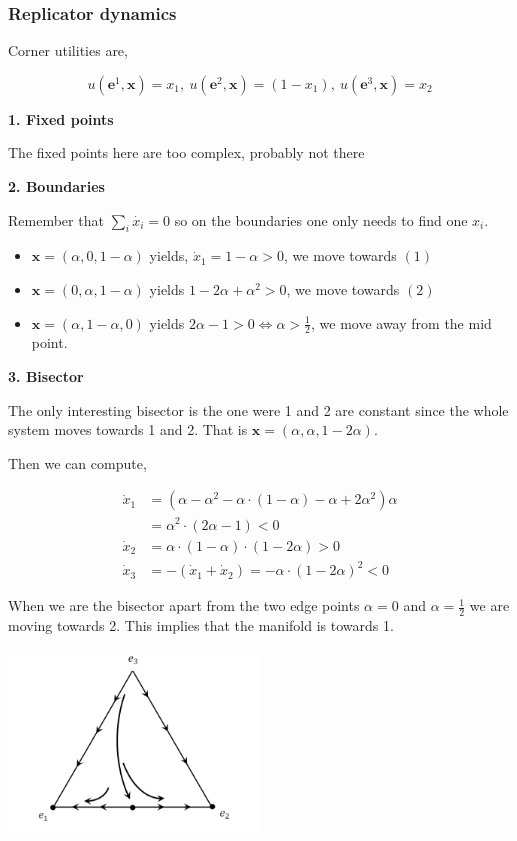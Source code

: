 \documentclass[american]{scrartcl}
\begin{document}
\subsubsection{Replicator dynamics}

Corner utilities are,

\begin{equation}
    u(\bm{e}^1, \bm{x}) = x_1, \ u(\bm{e}^2, \bm{x}) = (1 - x_1),\ u(\bm{e}^3, \bm{x}) = x_2
\end{equation}

\textbf{1. Fixed points}

The fixed points here are too complex, probably not there

\textbf{2. Boundaries}

Remember that $\sum_i \dot{x_i} = 0$ so on the boundaries one only needs to find one $x_i$.

\begin{itemize}
    \item $\bm{x} = \left( \alpha, 0, 1-\alpha \right)$ yields, $\dot{x}_1 = 1 - \alpha > 0$, we move towards $(1)$
    \item $\bm{x} = \left( 0, \alpha, 1-\alpha \right)$ yields $1 - 2\alpha + \alpha^2 > 0$, we move towards $(2)$
    \item $\bm{x} = \left( \alpha, 1-\alpha, 0 \right)$ yields $2 \alpha - 1 > 0 \iff \alpha > \frac{1}{2}$, we move away from the mid point.
\end{itemize}

\textbf{3. Bisector}

The only interesting bisector is the one were 1 and 2 are constant since the whole system moves towards 1 and 2. That is $\bm{x} = (\alpha, \alpha, 1 - 2\alpha)$.

Then we can compute,

\begin{equation}
    \begin{split}
        \dot{x}_1 &= \left( \alpha - \alpha^2 - \alpha \cdot (1 - \alpha) - \alpha + 2\alpha^2 \right) \alpha \\
        &= \alpha^2 \cdot (2 \alpha - 1) < 0 \\
        \dot{x}_2 &= \alpha \cdot (1 - \alpha) \cdot (1 - 2\alpha) > 0 \\
        \dot{x}_3 &= - (\dot{x}_1 + \dot{x}_2) = -\alpha \cdot (1 - 2\alpha)^2 < 0
    \end{split}
\end{equation}

When we are the bisector apart from the two edge points $\alpha = 0$ and $\alpha = \frac{1}{2}$ we are moving towards 2. This implies that the manifold is towards 1.

\begin{center}
    \includegraphics[width=0.5\textwidth]{images/weibull_14.PNG}
\end{center}
\end{document}
